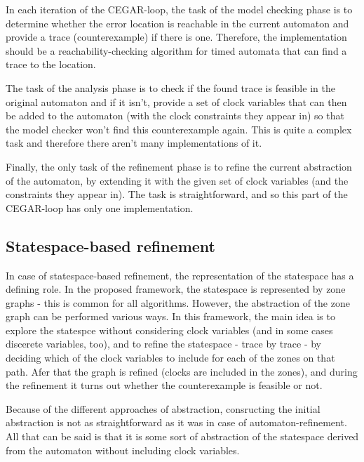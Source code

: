 In each iteration of the CEGAR-loop, the task of the model checking phase is to determine whether the error location is reachable in the current automaton and provide a trace (counterexample) if there is one. Therefore, the implementation should be a reachability-checking algorithm for timed automata that can find a trace to the location.

The task of the analysis phase is to check if the found trace is feasible in the original automaton and if it isn't, provide a set of clock variables that can then be added to the automaton (with the clock constraints they appear in) so that the model checker won't find this counterexample again. This is quite a complex task and therefore there aren't many implementations of it.

Finally, the only task of the refinement phase is to refine the current abstraction of the automaton, by extending it with the given set of clock variables (and the constraints they appear in). The task is straightforward, and so this part of the CEGAR-loop has only one implementation.



\subsection{Statespace-based refinement}

In case of statespace-based refinement, the representation of the statespace has a defining role. In the proposed framework, the statespace is represented by zone graphs - this is common for all algorithms. However, the abstraction of the zone graph can be performed various ways. In this framework, the main idea is to explore the statespce without considering clock variables (and in some cases discerete variables, too), and to refine the statespace - trace by trace - by deciding which of the clock variables to include for each of the zones on that path. Afer that the graph is refined (clocks are included in the zones), and during the refinement it turns out whether the counterexample is feasible or not.  

Because of the different approaches of abstraction, consructing the initial abstraction is not as straightforward as it was in case of automaton-refinement. All that can be said is that it is some sort of abstraction of the statespace derived from the automaton without including clock variables.

